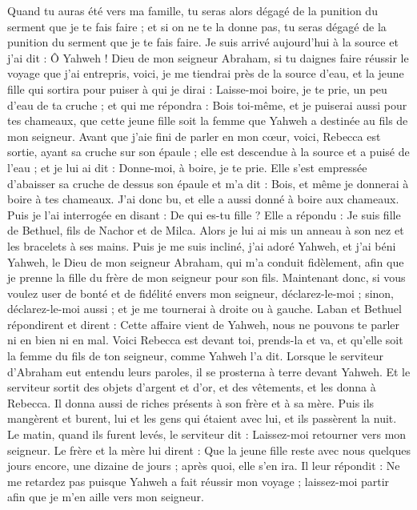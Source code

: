 \begin{multicols}{2}
Quand tu auras été vers ma famille, tu seras alors dégagé de la punition du serment que je te fais faire ; et si on ne te la donne pas, tu seras dégagé de la punition du serment que je te fais faire.
Je suis arrivé aujourd'hui à la source et j'ai dit : Ô Yahweh ! Dieu de mon seigneur Abraham, si tu daignes faire réussir le voyage que j'ai entrepris,
voici, je me tiendrai près de la source d'eau, et la jeune fille qui sortira pour puiser à qui je dirai : Laisse-moi boire, je te prie, un peu d’eau de ta cruche ; et qui me répondra :
Bois toi-même, et je puiserai aussi pour tes chameaux, que cette jeune fille soit la femme que Yahweh a destinée au fils de mon seigneur.
Avant que j’aie fini de parler en mon cœur, voici, Rebecca est sortie, ayant sa cruche sur son épaule ; elle est descendue à la source et a puisé de l'eau ; et je lui ai dit : Donne-moi, à boire, je te prie.
Elle s’est empressée d’abaisser sa cruche de dessus son épaule et m'a dit : Bois, et même je donnerai à boire à tes chameaux. J'ai donc bu, et elle a aussi donné à boire aux chameaux.
Puis je l'ai interrogée en disant : De qui es-tu fille ? Elle a répondu : Je suis fille de Bethuel, fils de Nachor et de Milca. Alors je lui ai mis un anneau à son nez et les bracelets à ses mains.
Puis je me suis incliné, j’ai adoré Yahweh, et j'ai béni Yahweh, le Dieu de mon seigneur Abraham, qui m'a conduit fidèlement, afin que je prenne la fille du frère de mon seigneur pour son fils.
Maintenant donc, si vous voulez user de bonté et de fidélité envers mon seigneur, déclarez-le-moi ; sinon, déclarez-le-moi aussi ; et je me tournerai à droite ou à gauche.
Laban et Bethuel répondirent et dirent : Cette affaire vient de Yahweh, nous ne pouvons te parler ni en bien ni en mal.
Voici Rebecca est devant toi, prends-la et va, et qu'elle soit la femme du fils de ton seigneur, comme Yahweh l’a dit.
Lorsque le serviteur d'Abraham eut entendu leurs paroles, il se prosterna à terre devant Yahweh.
Et le serviteur sortit des objets d'argent et d'or, et des vêtements, et les donna à Rebecca. Il donna aussi de riches présents à son frère et à sa mère.
Puis ils mangèrent et burent, lui et les gens qui étaient avec lui, et ils passèrent la nuit.  Le matin,  quand ils furent levés, le serviteur dit : Laissez-moi retourner vers mon seigneur.
Le frère et la mère lui dirent : Que la jeune fille reste avec nous quelques jours encore, une dizaine de jours ;  après quoi, elle s'en ira.
Il leur répondit : Ne me retardez pas puisque Yahweh a fait réussir mon voyage ; laissez-moi partir  afin que je m'en aille vers mon seigneur.

\end{multicols}
